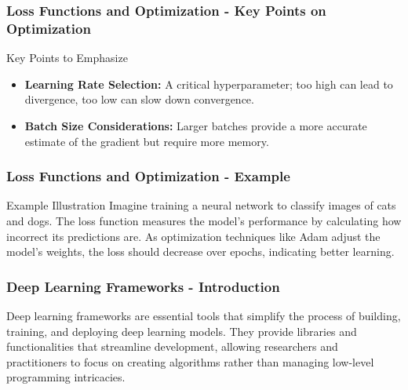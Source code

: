 \documentclass[aspectratio=169]{beamer}
\begin{document}
\begin{frame}[fragile]
    \frametitle{Loss Functions and Optimization - Key Points on Optimization}
    \begin{block}{Key Points to Emphasize}
        \begin{itemize}
            \item \textbf{Learning Rate Selection:} A critical hyperparameter; too high can lead to divergence, too low can slow down convergence.
            \item \textbf{Batch Size Considerations:} Larger batches provide a more accurate estimate of the gradient but require more memory.
        \end{itemize}
    \end{block}
\end{frame}

\begin{frame}[fragile]
    \frametitle{Loss Functions and Optimization - Example}
    \begin{block}{Example Illustration}
        Imagine training a neural network to classify images of cats and dogs. The loss function measures the model's performance by calculating how incorrect its predictions are. As optimization techniques like Adam adjust the model's weights, the loss should decrease over epochs, indicating better learning.
    \end{block}
\end{frame}

\begin{frame}
    \frametitle{Deep Learning Frameworks - Introduction}
    Deep learning frameworks are essential tools that simplify the process of building, training, and deploying deep learning models. They provide libraries and functionalities that streamline development, allowing researchers and practitioners to focus on creating algorithms rather than managing low-level programming intricacies.
\end{frame}
\end{document}
